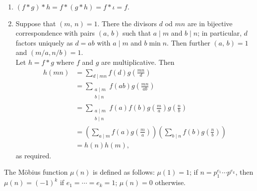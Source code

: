 \documentclass[a4paper,11pt]{article}
\theoremstyle{mythm}
\theoremstyle{mydef}
\begin{document}
{\begin{enumerate}[{\bf (a)}]
    uniquely determined as $g(1)=1/f(1)$. Next, assume we have determined the
    values $g(k)$ for $k<n$ in such a way that $(f*g)(k)=\iota(k)$. We need to
    solve $(f*g)(n)=\iota(n)$, i.e.,
    \[
      0 = \sum_{d \mid n}g(d)f\left( \frac{n}{d} \right) =
      f(1)g(n) + \sum_{\begin{smallmatrix}d \mid n \\ d <
        n\end{smallmatrix}}g(d)f\left( \frac{n}{d} \right)
    \]
    But then $g(n)$ is uniquely determined as
    \[
      g(n) = \frac{-1}{f(1)}\sum_{\begin{smallmatrix}d \mid n \\ d <
        n\end{smallmatrix}}g(d)f\left( \frac{n}{d} \right)
    \]
    This shows at once existence and uniqueness.
  \item $(f*g)*h = f*(g*h) = f*\iota = f$.
  \item Suppose that $(m,\,n)=1$. There the divisors $d$ od $mn$ are in
    bijective correspondence with pairs $(a,\,b)$ such that $a \mid m$ and $b
    \mid n$; in particular, $d$ factors uniquely as $d=ab$ with $a \mid m$ and
    $b \min n$. Then further $(a,\,b)=1$ and $(m/a,n/b)=1$. \\
    Let $h=f*g$ where $f$ and $g$ are multiplicative. Then
    \begin{align*}
      h(mn) &= \sum_{d \mid mn}f(d)g\left( \frac{mn}{d} \right) \\
      &= \sum_{\begin{smallmatrix}a \mid m \\ b \mid n\end{smallmatrix}}f(ab)g\left( \frac{mn}{ab} \right) \\
      &= \sum_{\begin{smallmatrix}a \mid m \\ b \mid n\end{smallmatrix}}f(a)f(b)g\left( \frac{m}{a} \right)g\left( \frac{n}{b} \right) \\
      &= \left( \sum_{a \mid m}f(a)g\left( \frac{m}{a} \right) \right)\left( \sum_{b \mid n}f(b)g\left( \frac{n}{b} \right) \right) \\
      &= h(n)h(m),
    \end{align*}
    as required.
  \end{enumerate}
}

The M\"{o}bius function $\mu(n)$ is defined as follows: $\mu(1)=1$; if
$n=p_1^{e_1} \cdots p^{e_k}$, then $\mu(n)=(-1)^k$ if $e_1=\cdots=e_k=1$;
$\mu(n)=0$ otherwise. \\
\end{document}
